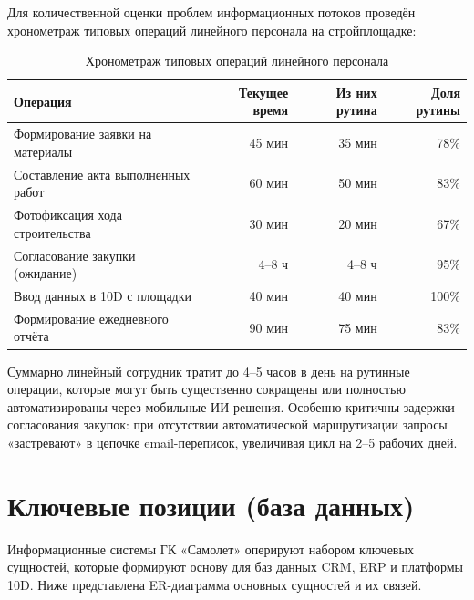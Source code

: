 \documentclass[12pt,a4paper]{article}
\begin{document}
Для количественной оценки проблем информационных потоков проведён хронометраж типовых операций линейного персонала на стройплощадке:

\begin{table}[H]
\centering
\caption{Хронометраж типовых операций линейного персонала}
\label{tab:timings}
\small
\begin{tabularx}{\textwidth}{|X|r|r|r|}
\hline
\rowcolor{samoletlight}
\textbf{Операция} & \textbf{Текущее время} & \textbf{Из них рутина} & \textbf{Доля рутины} \\
\hline
Формирование заявки на материалы & 45 мин & 35 мин & 78\% \\
\hline
Составление акта выполненных работ & 60 мин & 50 мин & 83\% \\
\hline
Фотофиксация хода строительства & 30 мин & 20 мин & 67\% \\
\hline
Согласование закупки (ожидание) & 4--8 ч & 4--8 ч & 95\% \\
\hline
Ввод данных в 10D с площадки & 40 мин & 40 мин & 100\% \\
\hline
Формирование ежедневного отчёта & 90 мин & 75 мин & 83\% \\
\hline
\end{tabularx}
\end{table}

Суммарно линейный сотрудник тратит до 4--5 часов в день на рутинные операции, которые могут быть существенно сокращены или полностью автоматизированы через мобильные ИИ-решения. Особенно критичны задержки согласования закупок: при отсутствии автоматической маршрутизации запросы «застревают» в цепочке email-переписок, увеличивая цикл на 2--5 рабочих дней.

\newpage

\section{Ключевые позиции (база данных)}

Информационные системы ГК «Самолет» оперируют набором ключевых сущностей, которые формируют основу для баз данных CRM, ERP и платформы 10D. Ниже представлена ER-диаграмма основных сущностей и их связей.
\end{document}
